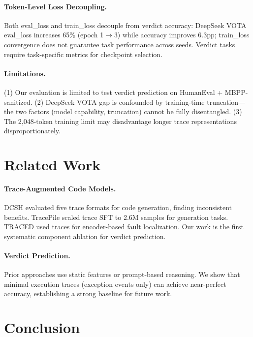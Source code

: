 \documentclass[11pt,a4paper]{article}
\begin{document}
\paragraph{Token-Level Loss Decoupling.} Both eval\_loss and train\_loss decouple from verdict accuracy: DeepSeek VOTA eval\_loss increases 65\% (epoch 1$\rightarrow$3) while accuracy improves 6.3pp; train\_loss convergence does not guarantee task performance across seeds. Verdict tasks require task-specific metrics for checkpoint selection.

\paragraph{Limitations.} (1) Our evaluation is limited to test verdict prediction on HumanEval + MBPP-sanitized. (2) DeepSeek VOTA gap is confounded by training-time truncation---the two factors (model capability, truncation) cannot be fully disentangled. (3) The 2,048-token training limit may disadvantage longer trace representations disproportionately.

\section{Related Work}

\paragraph{Trace-Augmented Code Models.} DCSH \cite{ni2024next} evaluated five trace formats for code generation, finding inconsistent benefits. TracePile \cite{jain2024tracepile} scaled trace SFT to 2.6M samples for generation tasks. TRACED \cite{dinella2022traced} used traces for encoder-based fault localization. Our work is the first systematic component ablation for verdict prediction.

\paragraph{Verdict Prediction.} Prior approaches use static features \cite{wang2021codet} or prompt-based reasoning. We show that minimal execution traces (exception events only) can achieve near-perfect accuracy, establishing a strong baseline for future work.

\section{Conclusion}
\end{document}
